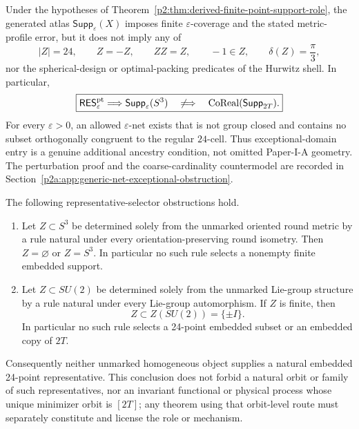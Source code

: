 \documentclass[11pt,a4paper]{article}
\begin{document}
\begin{proposition}
\label{p2a:prop:generic-resolution-not-exceptional}
Under the hypotheses of
Theorem~\ref{p2:thm:derived-finite-point-support-role}, the generated atlas
\(\mathsf{Supp}_\varepsilon(X)\) imposes finite \(\varepsilon\)-coverage and
the stated metric-profile error, but it does not imply any of
\[
 |Z|=24,\qquad Z=-Z,\qquad ZZ=Z,\qquad -1\in Z,
 \qquad \delta(Z)=\frac\pi3,
\]
nor the spherical-design or optimal-packing predicates of the Hurwitz shell.
In particular,
\[
 \boxed{
 \mathsf{RES}^{\rm pt}_\varepsilon
 \Longrightarrow\mathsf{Supp}_\varepsilon(S^3)
 \quad\not\Longrightarrow\quad
 \operatorname{CoReal}(\mathsf{Supp}_{2T}).}
\]
For every \(\varepsilon>0\), an allowed \(\varepsilon\)-net exists that is
not group closed and contains no subset orthogonally congruent to the regular
\(24\)-cell.  Thus exceptional-domain entry is a genuine additional ancestry
condition, not omitted Paper-I-A geometry.  The perturbation proof and the
coarse-cardinality countermodel are recorded in
Section~\ref{p2a:app:generic-net-exceptional-obstruction}.
\end{proposition}

\begin{proposition}
\label{p2a:prop:no-natural-finite-exceptional-selector}
The following representative-selector obstructions hold.
\begin{enumerate}[label=(\roman*),leftmargin=2.5em]
\item Let \(Z\subset S^3\) be determined solely from the unmarked oriented
round metric by a rule natural under every orientation-preserving round
isometry.  Then \(Z=\varnothing\) or \(Z=S^3\).  In particular no such rule
selects a nonempty finite embedded support.
\item Let \(Z\subset SU(2)\) be determined solely from the unmarked Lie-group
structure by a rule natural under every Lie-group automorphism.  If \(Z\) is
finite, then
\[
 Z\subset Z(SU(2))=\{\pm I\}.
\]
In particular no such rule selects a 24-point embedded subset or an embedded
copy of \(2T\).
\end{enumerate}
Consequently neither unmarked homogeneous object supplies a natural embedded
24-point representative.  This conclusion does not forbid a natural orbit or
family of such representatives, nor an invariant functional or physical
process whose unique minimizer orbit is \([2T]\); any theorem using that
orbit-level route must separately constitute and license the role or
mechanism.
\end{proposition}
\end{document}

